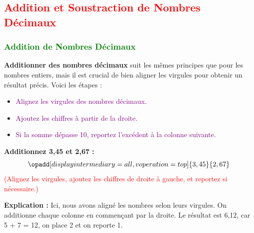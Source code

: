 \documentclass{article}
\begin{document}
\begin{center}

\captionsetup{justification=centering, font=small}
\end{center}

\subsection{\textcolor{red}{Addition et Soustraction de Nombres Décimaux}}

\subsubsection{\textcolor{green}{Addition de Nombres Décimaux}}

\vspace{0.25cm}

\textbf{Additionner des nombres décimaux} suit les mêmes principes que pour les nombres entiers, mais il est crucial de bien aligner les virgules pour obtenir un résultat précis. Voici les étapes :

    \begin{itemize}
        \item \textcolor{purple}{Alignez les virgules des nombres décimaux.}
        \item \textcolor{purple}{Ajoutez les chiffres à partir de la droite.}
        \item \textcolor{purple}{Si la somme dépasse 10, reportez l'excédent à la colonne suivante.}
    \end{itemize}

\vspace{0.2cm}

\begin{tcolorbox}[colback=orange!10!white, colframe=orange!75!black, sharp corners=south, boxrule=0.8mm, title=Exemple d'Addition]
    \textbf{Additionnez 3,45 et 2,67 :}
    \[
    \opadd[displayintermediary=all,voperation=top]{3,45}{2,67}
    \]
    \textcolor{red}{(Alignez les virgules, ajoutez les chiffres de droite à gauche, et reportez si nécessaire.)}
    
    \textbf{Explication :} Ici, nous avons aligné les nombres selon leurs virgules. On additionne chaque colonne en commençant par la droite. Le résultat est 6,12, car 5 + 7 = 12, on place 2 et on reporte 1.
\end{tcolorbox}
\end{document}
